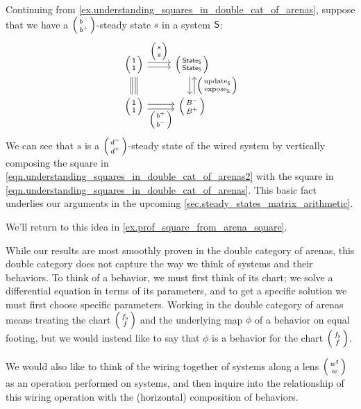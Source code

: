 \documentclass[DynamicalBook]{subfiles}
\begin{document}
\begin{example}\label{ex.understanding_squares_in_double_cat_of_arenas2}
  Continuing from \cref{ex.understanding_squares_in_double_cat_of_arenas},
  suppose that we have a $\lens{b^-}{b^+}$-steady state $s$ in a system $\mathsf{S}$:
  \begin{equation}\label{eqn.understanding_squares_in_double_cat_of_arenas2}
    \begin{tikzcd}
      \lens{\ord{1}}{\ord{1}} \ar[r, shift left, "\lens{s}{s}"] \ar[r, shift
      right] \ar[d, shift right, equals] \ar[d, shift left, equals] &
      \lens{\State{S}}{\State{S}} \ar[d, shift left, leftarrow,
      "\lens{\update{S}}{\expose{S}}"] \ar[d, shift right]\\
      \lens{\ord{1}}{\ord{1}} \ar[r, shift right, "\lens{b^+}{b^-}"'] \ar[r,
      shift left] & \lens{B^-}{B^+}
    \end{tikzcd}
  \end{equation}
  We can see that $s$ is a $\lens{d^-}{d^+}$-steady state of the wired system by
  vertically composing the square in
  \cref{eqn.understanding_squares_in_double_cat_of_arenas2} with the square in
  \cref{eqn.understanding_squares_in_double_cat_of_arenas}. This basic fact
  underlies our arguments in the upcoming \cref{sec.steady_states_matrix_arithmetic}. 

We'll return to this idea in \cref{ex.prof_square_from_arena_square}.
\end{example}

While our results are most smoothly proven in the double category of arenas,
this double category does not capture the way we think of systems and their
behaviors. To think of a behavior, we must first think of its chart; we solve a
differential equation in terms of its parameters, and to get a specific solution
we must first choose specific parameters. Working in the double category of
arenas means treating the chart $\lens{f_{\flat}}{f}$ and the underlying map
$\phi$ of a behavior on equal footing, but we would instead like to say that
$\phi$ is a behavior for the chart $\lens{f_{\flat}}{f}$. 

We would also like to think of the wiring together of systems along a lens
$\lens{w^{\sharp}}{w}$ as an operation performed on systems, and then inquire
into the relationship of this wiring operation with the (horizontal) composition
of behaviors.
\end{document}
